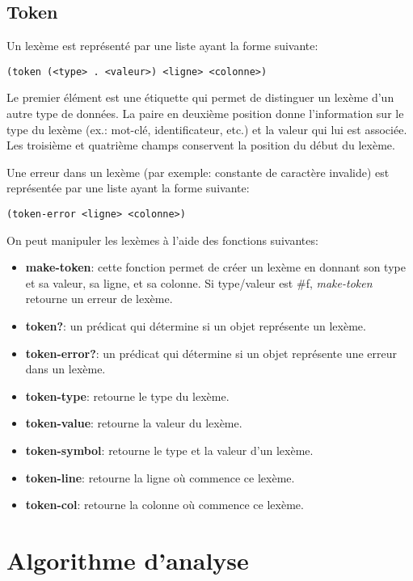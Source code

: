 \documentclass[10pt]{report}
\begin{document}
\subsection{Token}

Un lexème est représenté par une liste ayant la forme suivante:

\begin{verbatim}
(token (<type> . <valeur>) <ligne> <colonne>)
\end{verbatim}

Le premier élément est une étiquette qui permet de distinguer un
lexème d'un autre type de données.  La paire en deuxième position
donne l'information sur le type du lexème (ex.: mot-clé,
identificateur, etc.) et la valeur qui lui est associée.  Les
troisième et quatrième champs conservent la position du début du
lexème.

Une erreur dans un lexème (par exemple: constante de caractère
invalide) est représentée par une liste ayant la forme suivante:

\begin{verbatim}
(token-error <ligne> <colonne>)
\end{verbatim}


On peut manipuler les lexèmes à l'aide des fonctions suivantes:

\begin{itemize}
\item {\bf make-token}: cette fonction permet de créer un lexème en
  donnant son type et sa valeur, sa ligne, et sa colonne.  Si
  type/valeur est \#f, \emph{make-token} retourne un erreur de lexème.
\item {\bf token?}: un prédicat qui détermine si un objet représente
  un lexème.
\item {\bf token-error?}: un prédicat qui détermine si un objet
  représente une erreur dans un lexème.
\item {\bf token-type}: retourne le type du lexème.
\item {\bf token-value}: retourne la valeur du lexème.
\item {\bf token-symbol}: retourne le type et la valeur d'un lexème.
\item {\bf token-line}: retourne la ligne où commence ce lexème.
\item {\bf token-col}: retourne la colonne où commence ce lexème.
\end{itemize}

\section{Algorithme d'analyse}
\end{document}
